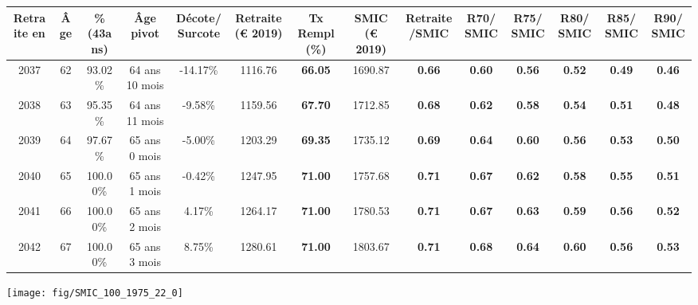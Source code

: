 \begin{adjustbox}{max width=\textwidth} 
\begin{tabular}[htb]{|c|c||c|c|c||c|c||c|c||c|c|c|c|c|} 
\hline 
 Retraite en &  Âge &  \%(43ans) &  Âge pivot &  Décote/Surcote &  Retraite (\euro{} 2019) &  Tx Rempl(\%) &  SMIC (\euro{} 2019) &  Retraite/SMIC &  R70/SMIC &  R75/SMIC &  R80/SMIC &  R85/SMIC &  R90/SMIC \\ 
\hline \hline 
 2037 &  62 &  93.02\% &  64 ans 10 mois &  -14.17\% &  1116.76 &  {\bf 66.05} &  1690.87 &  {\bf {\color{red} 0.66}} &  {\bf {\color{red} 0.60}} &  {\bf {\color{red} 0.56}} &  {\bf {\color{red} 0.52}} &  {\bf {\color{red} 0.49}} &  {\bf {\color{red} 0.46}} \\ 
\hline 
 2038 &  63 &  95.35\% &  64 ans 11 mois &  -9.58\% &  1159.56 &  {\bf 67.70} &  1712.85 &  {\bf {\color{red} 0.68}} &  {\bf {\color{red} 0.62}} &  {\bf {\color{red} 0.58}} &  {\bf {\color{red} 0.54}} &  {\bf {\color{red} 0.51}} &  {\bf {\color{red} 0.48}} \\ 
\hline 
 2039 &  64 &  97.67\% &  65 ans 0 mois &  -5.00\% &  1203.29 &  {\bf 69.35} &  1735.12 &  {\bf {\color{red} 0.69}} &  {\bf {\color{red} 0.64}} &  {\bf {\color{red} 0.60}} &  {\bf {\color{red} 0.56}} &  {\bf {\color{red} 0.53}} &  {\bf {\color{red} 0.50}} \\ 
\hline 
 2040 &  65 &  100.00\% &  65 ans 1 mois &  -0.42\% &  1247.95 &  {\bf 71.00} &  1757.68 &  {\bf {\color{red} 0.71}} &  {\bf {\color{red} 0.67}} &  {\bf {\color{red} 0.62}} &  {\bf {\color{red} 0.58}} &  {\bf {\color{red} 0.55}} &  {\bf {\color{red} 0.51}} \\ 
\hline 
 2041 &  66 &  100.00\% &  65 ans 2 mois &  4.17\% &  1264.17 &  {\bf 71.00} &  1780.53 &  {\bf {\color{red} 0.71}} &  {\bf {\color{red} 0.67}} &  {\bf {\color{red} 0.63}} &  {\bf {\color{red} 0.59}} &  {\bf {\color{red} 0.56}} &  {\bf {\color{red} 0.52}} \\ 
\hline 
 2042 &  67 &  100.00\% &  65 ans 3 mois &  8.75\% &  1280.61 &  {\bf 71.00} &  1803.67 &  {\bf {\color{red} 0.71}} &  {\bf {\color{red} 0.68}} &  {\bf {\color{red} 0.64}} &  {\bf {\color{red} 0.60}} &  {\bf {\color{red} 0.56}} &  {\bf {\color{red} 0.53}} \\ 
\hline 
\hline 
\end{tabular} 
\end{adjustbox} 
 
 \vspace{0.1cm} 

 {\hspace{-2.2cm}\texttt{[image: fig/SMIC\_100\_1975\_22\_0]}} 


